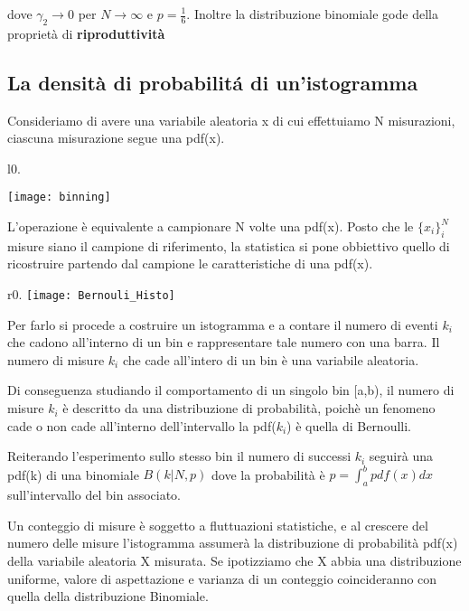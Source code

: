 dove $\gamma_2 \rightarrow 0$ per $N \rightarrow \infty$ e $p = \frac{1}{6}$.
Inoltre la distribuzione binomiale gode della propriet\`{a} di \textbf{riproduttivit\`{a}}
\subsection{La densit\`{a} di probabilit\'{a} di un'istogramma}



Consideriamo di avere una variabile aleatoria x di cui effettuiamo N misurazioni, ciascuna misurazione segue una pdf(x). 

\begin{wrapfigure}{l}{0.\textwidth}
\centering

\texttt{[image: binning]}	

\end{wrapfigure}

\noindent L'operazione \`{e} equivalente a campionare N volte una pdf(x). Posto che le $\{x_{i}\}_{i}^N$ misure siano il campione di riferimento, la statistica si pone obbiettivo quello di ricostruire partendo dal campione le caratteristiche di una pdf(x).
\begin{wrapfigure}{r}{0.\textwidth}
\centering
\texttt{[image: Bernouli\_Histo]}	

\end{wrapfigure}
\noindent Per farlo si procede a costruire un istogramma e a contare il numero di eventi $k_{i}$ che cadono all'interno di un bin e rappresentare tale numero con una barra. Il numero di misure $k_i$ che cade all'intero di un bin \`{e} una variabile aleatoria.


Di conseguenza studiando il comportamento di un singolo bin [a,b), il numero di misure $k_{i}$ \`{e} descritto da una distribuzione di probabilit\`{a}, poich\`{e} un fenomeno cade o non cade all'interno dell'intervallo la pdf($k_i$) \`{e} quella di Bernoulli. 

Reiterando l'esperimento sullo stesso bin il numero di successi $k_{i}$ seguir\`{a} una pdf(k) di una binomiale $B(k \vert N,p)$ dove la probabilit\`{a} \`{e} $ p = \int_{a}^{b}{pdf(x)dx}$ sull'intervallo del bin associato.

 Un conteggio di misure \`{e} soggetto a fluttuazioni statistiche, e al crescere del numero delle misure l'istogramma assumer\`{a} la distribuzione di probabilit\`{a} pdf(x) della variabile aleatoria X misurata.
\newline
\noindent Se ipotizziamo che X abbia una distribuzione uniforme, valore di aspettazione e varianza di un conteggio coincideranno con quella della distribuzione Binomiale.

